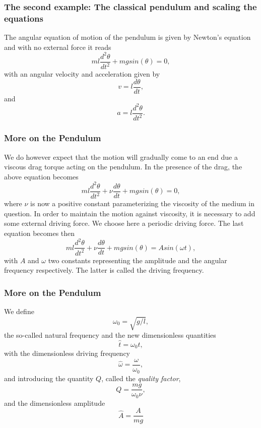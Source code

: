 \documentclass{beamer}
\begin{document}
\begin{frame}
\frametitle{The second example: The classical pendulum and scaling the equations}

\begin{block}{}
The angular equation of motion of the pendulum is given by
Newton's equation and with no external force it reads 
\begin{equation}
  ml\frac{d^2\theta}{dt^2}+mgsin(\theta)=0,
\end{equation}
with an angular velocity and acceleration given by
\begin{equation}
     v=l\frac{d\theta}{dt},
\end{equation}
and 
\begin{equation}
     a=l\frac{d^2\theta}{dt^2}.
\end{equation}
\end{block}
\end{frame}

\begin{frame}
\frametitle{More on the Pendulum}

\begin{block}{}
We do however expect that the motion will gradually come to an end due a viscous drag torque acting on the pendulum. 
In the presence of the drag, the above equation becomes
\begin{equation}
   ml\frac{d^2\theta}{dt^2}+\nu\frac{d\theta}{dt}  +mgsin(\theta)=0, \label{eq:pend1}
\end{equation}
where $\nu$ is now a positive constant parameterizing the viscosity
of the medium in question. In order to maintain the motion against
viscosity, it is necessary to add some external driving force. 
We choose here a periodic driving force. The last equation becomes then
\begin{equation}
   ml\frac{d^2\theta}{dt^2}+\nu\frac{d\theta}{dt}  +mgsin(\theta)=Asin(\omega t), \label{eq:pend2}
\end{equation}
with $A$ and $\omega$ two constants representing the amplitude and 
the angular frequency respectively. The latter is called the driving frequency.
\end{block}
\end{frame}

\begin{frame}
\frametitle{More on the Pendulum}

\begin{block}{}
We define 
  \[
      \omega_0=\sqrt{g/l},
  \]
the so-called natural frequency and the new dimensionless quantities
  \[
      \hat{t}=\omega_0t,
  \]
with the dimensionless driving frequency
  \[
     \hat{\omega}=\frac{\omega}{\omega_0},
  \]
and introducing the quantity $Q$, called the \emph{quality factor},
  \[
     Q=\frac{mg}{\omega_0\nu},
  \]
  and the dimensionless amplitude 
\[
\hat{A}=\frac{A}{mg}
  \]
\end{block}
\end{frame}
\end{document}
